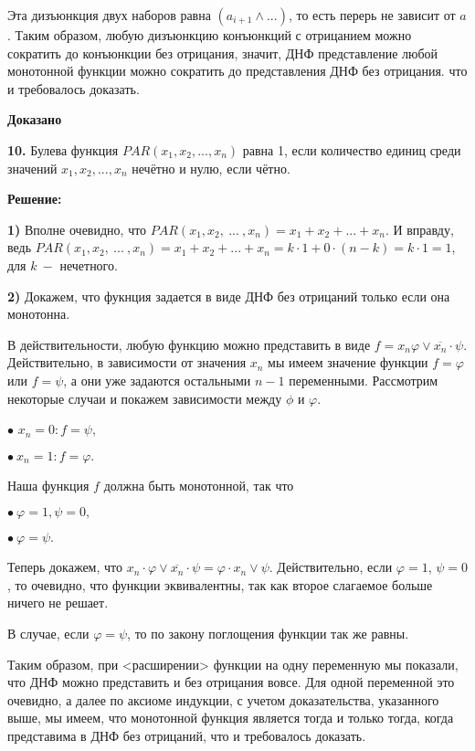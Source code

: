 \documentclass[a4paper,12pt]{article} %
\begin{document}
Эта дизъюнкция двух наборов равна $(a_{i+1}\wedge...)$, то есть перерь не зависит от $a$.  Таким образом, любую дизъюнкцию конъюнкций с отрицанием можно сократить
до конъюнкции без отрицания, значит, ДНФ представление любой монотонной функции можно сократить до представления ДНФ без отрицания. что и требовалось доказать.


\begin{flushright}
\begin{large}
\textbf {Доказано}
\end{large}
\end{flushright}

{\bf 10.} Булева функция $PAR(x_1,x_2,...,x_n)$ равна 1, если количество единиц среди значений $x_1,x_2,...,x_n$ нечётно и нулю, если чётно.
\begin{center}
\bfseries
{\Large Решение: }
\end{center}

{\bf 1)} Вполне очевидно, что $PAR(x_1,x_2,\ ...\ ,x_n) = x_1 + x_2 + ... + x_n$. И вправду, ведь $PAR(x_1,x_2,\ ...\ ,x_n) = x_1 + x_2 + ... + x_n = k\cdot 1 + 0 \cdot (n - k) = k\cdot 1 = 1$, для $k\ - $ нечетного.

{\bf 2)} Докажем, что фукнция задается в виде ДНФ без отрицаний только если она монотонна.

В действительности, любую функцию можно представить в виде $f = x_n \varphi \vee \overline{x_n}\cdot \psi$. Действительно, в зависимости от значения $x_n$ мы имеем значение функции $f = \varphi$ или $f = \psi$, а они уже задаются остальными $n - 1$ переменными. Рассмотрим некоторые случаи и покажем зависимости между $\phi$ и $\varphi$.

$\bullet$ $x_n = 0 : f = \psi,$

$\bullet\ x_n = 1: f = \varphi.$

Наша функция $f$ должна быть монотонной, так что 

$\bullet\ \varphi = 1, \psi = 0,$

$\bullet\ \varphi = \psi.$

Теперь докажем, что $x_n \cdot \varphi \vee \overline{x_n} \cdot \psi = \varphi \cdot x_n \vee \psi$. Действительно, если $\varphi = 1$, $\psi = 0$, то очевидно, что функции эквивалентны, так как второе слагаемое больше ничего не решает.

В случае, если $\varphi = \psi$, то по закону поглощения функции так же равны.

Таким образом, при <расширении> функции на одну переменную мы показали, что ДНФ можно представить и без отрицания вовсе. Для одной переменной это очевидно, а далее по аксиоме индукции, с учетом доказательства, указанного выше, мы имеем, что монотонной функция является тогда и только тогда, когда представима в ДНФ без отрицаний, что и требовалось доказать.
\end{document}
